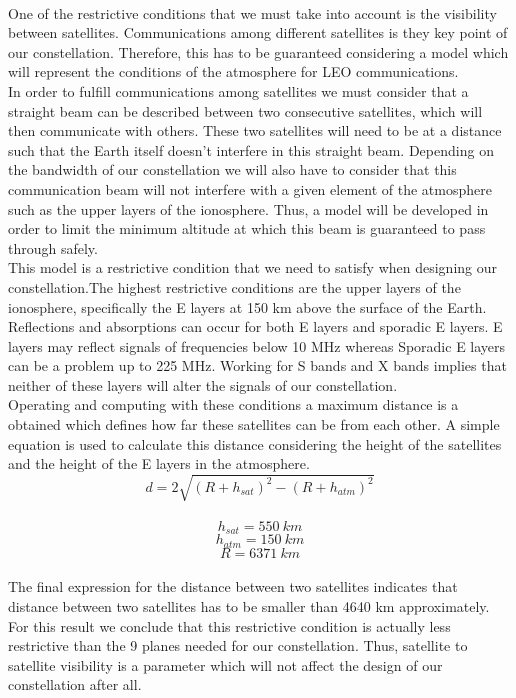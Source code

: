 \paragraph{ }

One of the restrictive conditions that we must take into account is the visibility between satellites. Communications among different satellites is they key point of our constellation. Therefore, this has to be guaranteed considering a model which will represent the conditions of the atmosphere for LEO communications. \\

In order to fulfill communications among satellites we must consider that a straight beam can be described between two consecutive satellites, which will then communicate with others. These two satellites will need to be at a distance such that the Earth itself doesn't interfere in this straight beam. Depending on the bandwidth of our constellation we will also have to consider that this communication beam will not interfere with a given element of the atmosphere such as the upper layers of the ionosphere. Thus, a model will be developed in order to limit the minimum altitude at which this beam is guaranteed to pass through safely. \\

This model is a restrictive condition that we need to satisfy when designing our constellation.The highest restrictive conditions are the upper layers of the ionosphere, specifically the E layers at 150 km above the surface of the Earth. Reflections and absorptions can occur for both E layers and sporadic E layers. E layers may reflect signals of frequencies below 10 MHz whereas Sporadic E layers can be a problem up to 225 MHz. Working for S bands and X bands implies that neither of these layers will alter the signals of our constellation. \\

Operating and computing with these conditions a maximum distance is a obtained which defines how far these satellites can be from each other. A simple equation is used to calculate this distance considering the height of the satellites and the height of the E layers in the atmosphere. \\

\[ d = 2 \sqrt{(R+h_{sat})^2 - (R+h_{atm})^2} \]\\

\[ h_{sat} = 550\ km\] 
\[ h_{atm} = 150\ km\]
\[R = 6371\ km\] \\

The final expression for the distance between two satellites indicates that distance between two satellites has to be smaller than 4640 km approximately. For this result we conclude that this restrictive condition is actually less restrictive than the 9 planes needed for our constellation. Thus, satellite to satellite visibility is a parameter which will not affect the design of our constellation after all. 
